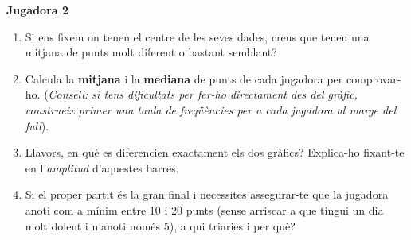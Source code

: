 \documentclass[12pt,a4paper]{article}
\begin{document}
\begin{minipage}{0.48\textwidth}
    \begin{center}
    \textbf{Jugadora 2} \\ \vspace{0.2cm}
    \end{center}
\end{minipage}

\begin{enumerate}[label=\alph*)]
    \item Si ens fixem on tenen el centre de les seves dades, creus que tenen una mitjana de punts molt diferent o bastant semblant? \vspace{1.2cm}
    \item Calcula la \textbf{mitjana} i la \textbf{mediana} de punts de cada jugadora per comprovar-ho. (\textit{Consell: si tens dificultats per fer-ho directament des del gràfic, construeix primer una taula de freqüències per a cada jugadora al marge del full}). \vspace{3cm}
    \item Llavors, en què es diferencien exactament els dos gràfics? Explica-ho fixant-te en l'\textit{amplitud} d'aquestes barres. \vspace{2cm}
    \item Si el proper partit és la gran final i necessites assegurar-te que la jugadora anoti com a mínim entre 10 i 20 punts (sense arriscar a que tingui un dia molt dolent i n'anoti només 5), a qui triaries i per què? \vspace{2cm}
\end{enumerate}
\newpage
\end{document}
